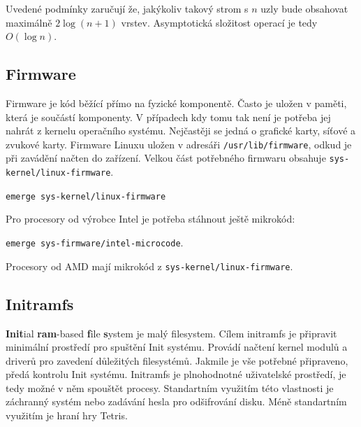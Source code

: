 \documentclass[12pt,a4paper,twoside,]{article}
\begin{document}
{Uvedené podmínky zaručují že, jakýkoliv takový strom s $n$ uzly bude obsahovat maximálně $2\log(n+1)$ vrstev. Asymptotická složitost operací je tedy $O(\log n)$.\\


\subsection{\textsf{Firmware}}

Firmware je kód běžící přímo na fyzické komponentě. Často je uložen v paměti, která je součástí komponenty. V případech kdy tomu tak není je potřeba jej nahrát z kernelu operačního systému. Nejčastěji se jedná o grafické karty, síťové a zvukové karty. 
Firmware Linuxu uložen v adresáři \texttt{/usr/lib/firmware}, odkud je při zavádění načten do zařízení. Velkou část potřebného firmwaru obsahuje \texttt{sys-kernel/linux-firmware}. 

\texttt{emerge sys-kernel/linux-firmware}

Pro procesory od výrobce Intel je potřeba stáhnout ještě mikrokód:

\texttt{emerge sys-firmware/intel-microcode}. 

Procesory od AMD mají mikrokód z \texttt{sys-kernel/linux-firmware}.
\subsection{\textsf{Initramfs}}
{\bf Init}ial {\bf ram}-based {\bf f}ile {\bf s}ystem je malý filesystem. Cílem initramfs je připravit minimální prostředí pro spuštění Init systému. Provádí načtení kernel modulů a driverů pro zavedení důležitých filesystémů. Jakmile je vše potřebné připraveno, předá kontrolu Init systému.
Initramfs je plnohodnotné uživatelské prostředí, je tedy možné v něm spouštět procesy. Standartním využitím této vlastnosti je záchranný systém nebo zadávání hesla pro odšifrování disku. Méně standartním využitím je hraní hry Tetris. 

}
\end{document}
